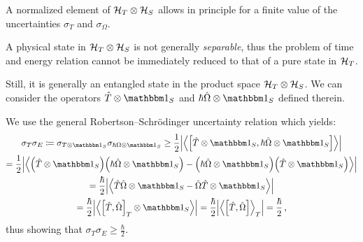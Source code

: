 A normalized element of $\mathcal{H}_T \otimes \mathcal{H}_S$ allows in principle for a finite value
of the uncertainties $\sigma_{T}$ and $\sigma_{\Omega}$.

A physical state in $\mathcal{H}_T \otimes \mathcal{H}_S$ is not generally
\emph{separable},
thus
the problem of time and energy relation cannot be immediately reduced to that of
a pure state in $\mathcal{H}_T$.

Still, it is generally an entangled state in the product space $\mathcal{H}_T \otimes \mathcal{H}_S$.
We can consider the
operators $\op{T} \ox \idop_{S}$ and $\hbar\op{\Omega} \ox \idop_{S}$
defined therein.

We use the general Robertson--Schr\"{o}dinger uncertainty relation which yields:%
\begin{multline}
  \sigma_T \sigma_E \eqbydef
  \sigma_{T \ox \idop_S} \sigma_{\hbar\Omega \ox \idop_S} \geq
  \frac{1}{2} \abs{\expval{\comm
    {\op{T}\ox\idop_S} {\hbar\op{\Omega}\ox\idop_S}
  }}
  \\
  = \frac{1}{2} \abs{\expval{
      \qty(\op{T}\ox\idop_S) \qty(\hbar\op{\Omega}\ox\idop_S) -
      \qty(\hbar\op{\Omega}\ox\idop_S) \qty(\op{T}\ox\idop_S)
    }}
  \\
  = \frac{\hbar}{2} \abs{\expval{
    \op{T}\op{\Omega}\ox\idop_S - \op{\Omega}\op{T}\ox\idop_S
  }}
  \\
  = \frac{\hbar}{2} \abs{\expval{
    \comm{\op{T}}{\op{\Omega}}_T \ox \idop_S
  }} =
  \frac{\hbar}{2} \abs{\expval{\comm
    {\op{T}}{\op{\Omega}}
  }_T} =
  \frac{\hbar}{2}
  \,\text{,}
\end{multline}
thus showing that $\sigma_T \sigma_E \geq \frac{\hbar}{2}$.





